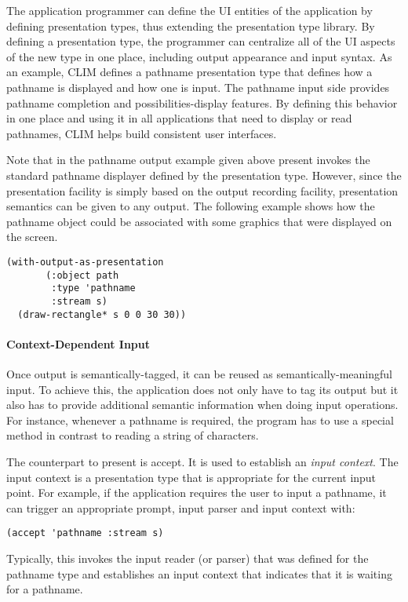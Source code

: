 \documentclass[twocolumn,a4paper]{article}
\newcommand {\concept} [1] {{\sl #1}\index{#1}}
\newcommand {\code}[1]{{\sffamily #1}}
\newcommand {\CLIM}{{\small CLIM}}
\let\method\code
\begin{document}
The application programmer can define the UI entities of the application by defining presentation types, thus extending the presentation type library. By defining a presentation type, the programmer can centralize all of the UI aspects of the new type in one place, including output appearance and input syntax. As an example, \CLIM{} defines a pathname presentation type that defines how a pathname is displayed and how one is input. The pathname input side provides pathname completion and possibilities-display features. By defining this behavior in one place and using it in all applications that need to display or read pathnames, \CLIM{} helps build consistent user interfaces.

Note that in the pathname output example given above \method{present} invokes the standard pathname displayer defined by the presentation type. However, since the presentation facility is simply based on the output recording facility, presentation semantics can be given to any output. The following example shows how the pathname object could be associated with some graphics that were displayed on the screen.

\begin{lstlisting}
(with-output-as-presentation 
       (:object path
        :type 'pathname 
        :stream s) 
  (draw-rectangle* s 0 0 30 30))
\end{lstlisting}

\paragraph*{Context-Dependent Input} Once output is semantically-tagged, it can be reused as semantically-meaningful input. To achieve this, the application does not only have to tag its output but it also has to provide additional  semantic information when doing input operations. For instance, whenever a pathname is required, the program has to use a special method in contrast to reading a string of characters.

The counterpart to \method{present} is \method{accept}. It is used to establish an \concept{input context}.  The input context is a presentation type that is appropriate for the current input point. For example, if the application requires the user to input a pathname, it can trigger an appropriate prompt, input parser and input context with:
\begin{lstlisting}
(accept 'pathname :stream s)
\end{lstlisting}
Typically, this invokes the input reader (or parser) that was defined for the pathname type and establishes an input context that indicates that it is waiting for a pathname.
\end{document}
